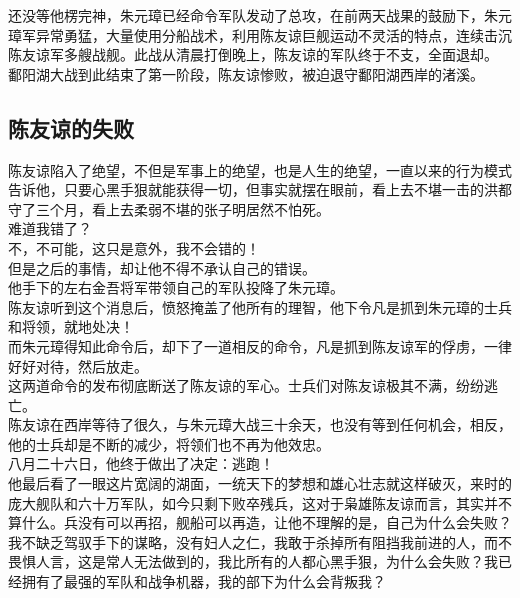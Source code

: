 \begin{multicols}{\theparacolNo}
还没等他楞完神，朱元璋已经命令军队发动了总攻，在前两天战果的鼓励下，朱元璋军异常勇猛，大量使用分船战术，利用陈友谅巨舰运动不灵活的特点，连续击沉陈友谅军多艘战舰。此战从清晨打倒晚上，陈友谅的军队终于不支，全面退却。\\

鄱阳湖大战到此结束了第一阶段，陈友谅惨败，被迫退守鄱阳湖西岸的渚溪。\\

\subsection{陈友谅的失败}
陈友谅陷入了绝望，不但是军事上的绝望，也是人生的绝望，一直以来的行为模式告诉他，只要心黑手狠就能获得一切，但事实就摆在眼前，看上去不堪一击的洪都守了三个月，看上去柔弱不堪的张子明居然不怕死。\\

难道我错了？\\

不，不可能，这只是意外，我不会错的！\\

但是之后的事情，却让他不得不承认自己的错误。\\

他手下的左右金吾将军带领自己的军队投降了朱元璋。\\

陈友谅听到这个消息后，愤怒掩盖了他所有的理智，他下令凡是抓到朱元璋的士兵和将领，就地处决！\\

而朱元璋得知此命令后，却下了一道相反的命令，凡是抓到陈友谅军的俘虏，一律好好对待，然后放走。\\

这两道命令的发布彻底断送了陈友谅的军心。士兵们对陈友谅极其不满，纷纷逃亡。\\

陈友谅在西岸等待了很久，与朱元璋大战三十余天，也没有等到任何机会，相反，他的士兵却是不断的减少，将领们也不再为他效忠。\\

八月二十六日，他终于做出了决定：逃跑！\\

他最后看了一眼这片宽阔的湖面，一统天下的梦想和雄心壮志就这样破灭，来时的庞大舰队和六十万军队，如今只剩下败卒残兵，这对于枭雄陈友谅而言，其实并不算什么。兵没有可以再招，舰船可以再造，让他不理解的是，自己为什么会失败？\\

我不缺乏驾驭手下的谋略，没有妇人之仁，我敢于杀掉所有阻挡我前进的人，而不畏惧人言，这是常人无法做到的，我比所有的人都心黑手狠，为什么会失败？我已经拥有了最强的军队和战争机器，我的部下为什么会背叛我？\\


\end{multicols}
